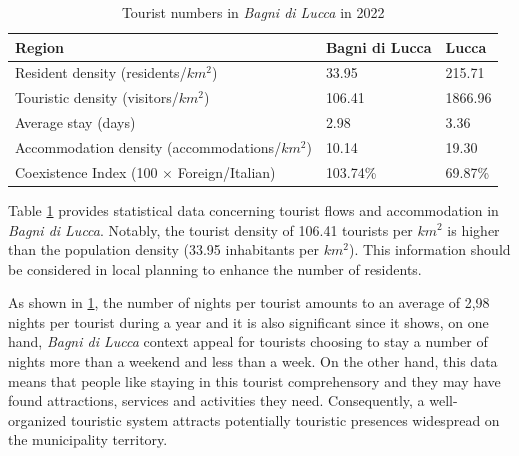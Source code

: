 \documentclass[sustainability,article,submit,pdftex,moreauthors]{Definitions/mdpi}
\begin{document}
\begin{table}
    \footnotesize
    \centering
    \begin{tabular}{l||l|l} \hline 
        {\bf Region} & {\bf Bagni di Lucca} & {\bf Lucca} \\ \hline
        Resident density (residents/{$km^2$}) & 33.95 & 215.71 \\
        Touristic density (visitors/{$km^2$}) & 106.41 & 1866.96 \\
        Average stay  (days) &  2.98 &  3.36 \\
        Accommodation density (accommodations/{$km^2$}) & 10.14 & 19.30 \\
        Coexistence Index (100 $\times$ Foreign/Italian) & 103.74\% &  69.87\% \\ 
         \hline
    \end{tabular}
    \caption{Tourist numbers in \emph{Bagni di Lucca} in 2022}
    \label{tab:tourism}
\end{table}

Table \ref{tab:tourism} provides statistical data concerning tourist flows and accommodation in \emph{Bagni di Lucca}. Notably, the tourist density of 106.41 tourists per $km^2$ is higher than the population density (33.95 inhabitants per $km^2$). This information should be considered in local planning to enhance the number of residents.

As shown in \ref{tab:tourism}, the number of nights per tourist amounts to an average of 2,98 nights per tourist during a year and it is also significant since it shows, on one hand, \emph{Bagni di Lucca} context appeal for tourists choosing to stay a number of nights more than a weekend and less than a week. On the other hand, this data means that people like staying in this tourist comprehensory and they may have found attractions, services and activities they need. Consequently, a well-organized touristic system attracts potentially touristic presences widespread on the municipality territory.
\end{document}
